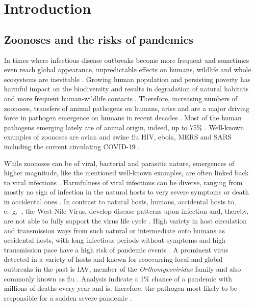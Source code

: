 \chapter{Introduction} \label{chap:Introduction}

\section{Zoonoses and the risks of pandemics}

In times where infectious disease outbreaks become more frequent and sometimes even reach global appearance, unpredictable effects on humans, wildlife and whole ecosystems are inevitable \autocite{schmeller_biodiversity_2020}. Growing human population and persisting poverty has harmful impact on the biodiversity and results in degradation of natural habitats and more frequent human-wildlife contacts  \autocite{schmeller_biodiversity_2020}. Therefore, increasing numbers of zoonoses, transfers of animal pathogens on humans, arise and are a major driving force in pathogen emergence on humans in recent decades \autocite{jones_global_2008}. Most of the human pathogens emerging lately are of animal origin, indeed, up to 75\% \autocite{woolhouse_risk_2001}. Well-known examples of zoonoses are avian and swine flu \gls{HIV}, ebola, \gls{MERS} and \gls{SARS} including the current circulating COVID-19 \autocite{van_reeth_avian_2007, sharp_origins_2011, suwantarat_risks_2015, verity_estimates_2020}.

\vspace{1em}

While zoonoses can be of viral, bacterial and parasitic nature, emergences of higher magnitude, like the mentioned well-known examples, are often linked back to viral infections \autocite{woolhouse_risk_2001}. Harmfulness of viral infections can be diverse, ranging from mostly no sign of infection in the natural hosts to very severe symptoms or death in accidental ones \autocite{wahlgren_influenza_2011}. In contrast to natural hosts, humans, accidental hosts to, e.~g.~, the West Nile Virus, develop disease patterns upon infection and, thereby, are not able to fully support the virus life cycle \autocite{gea-banacloche_west_2004}. High variety in host circulation and transmission ways from such natural or intermediate onto humans as accidental hosts, with long infectious periods without symptoms and high transmission pace have a high risk of pandemic events \autocite{jamison_chapter_2017}. A prominent virus detected in a variety of hosts and known for reoccurring local and global outbreaks in the past is \gls{IAV}, member of the \textit{Orthomyxoviridae} family and also commonly known as flu \autocite{wahlgren_influenza_2011}. Analysis indicate a 1\% chance of a pandemic with millions of deaths every year and is, therefore, the pathogen most likely to be responsible for a sudden severe pandemic \autocite{jamison_chapter_2017}. 

